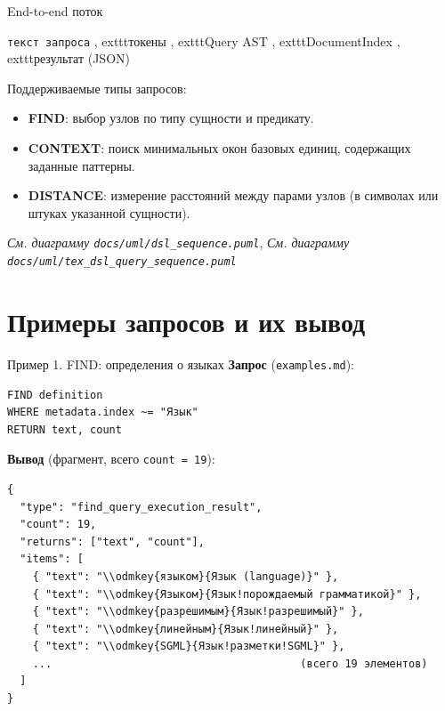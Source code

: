 \documentclass[aspectratio=169,11pt]{beamer}
\newcommand{\uml}[1]{\textit{См. диаграмму \texttt{docs/uml/#1}}}
\begin{document}
\begin{frame}{End-to-end поток}
  \begin{center}
    \texttt{текст запроса}
    , 	exttt{токены}
    , 	exttt{Query AST}
    , 	exttt{DocumentIndex}
    , 	exttt{результат (JSON)}
  \end{center}
  \vspace{0.3em}
  Поддерживаемые типы запросов:
  \begin{itemize}
    \item \textbf{FIND}: выбор узлов по типу сущности и предикату.
    \item \textbf{CONTEXT}: поиск минимальных окон базовых единиц,
          содержащих заданные паттерны.
    \item \textbf{DISTANCE}: измерение расстояний между парами узлов
          (в символах или штуках указанной сущности).
  \end{itemize}
  \uml{dsl\_sequence.puml}, \uml{tex\_dsl\_query\_sequence.puml}
\end{frame}

\section{Примеры запросов и их вывод}

\begin{frame}[fragile]{Пример 1. FIND: определения о языках}
  \textbf{Запрос} (\texttt{examples.md}):
\begin{Verbatim}[fontsize=\small,frame=single,formatcom=\color{dslkw}]
FIND definition
WHERE metadata.index ~= "Язык"
RETURN text, count
\end{Verbatim}
  \textbf{Вывод} (фрагмент, всего \texttt{count = 19}):
\begin{Verbatim}[fontsize=\scriptsize,frame=single]
{
  "type": "find_query_execution_result",
  "count": 19,
  "returns": ["text", "count"],
  "items": [
    { "text": "\\odmkey{языком}{Язык (language)}" },
    { "text": "\\odmkey{Языком}{Язык!порождаемый грамматикой}" },
    { "text": "\\odmkey{разрешимым}{Язык!разрешимый}" },
    { "text": "\\odmkey{линейным}{Язык!линейный}" },
    { "text": "\\odmkey{SGML}{Язык!разметки!SGML}" },
    ...                                       (всего 19 элементов)
  ]
}
\end{Verbatim}
\end{frame}
\end{document}
